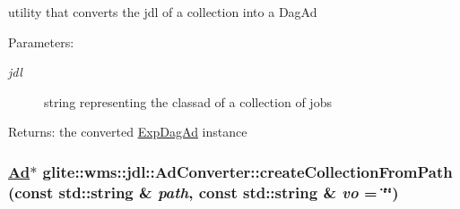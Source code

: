 utility that converts the jdl of a collection into a Dag\-Ad \begin{Desc}
\item[Parameters:]
\begin{description}
\item[{\em jdl}]string representing the classad of a collection of jobs \end{description}
\end{Desc}
\begin{Desc}
\item[Returns:]the converted \hyperlink{classglite_1_1wms_1_1jdl_1_1ExpDagAd}{Exp\-Dag\-Ad} instance\end{Desc}
\hypertarget{classglite_1_1wms_1_1jdl_1_1AdConverter_z21_7}{
\subsubsection[createCollectionFromPath]{\setlength{\rightskip}{0pt plus 5cm}\hyperlink{classglite_1_1wms_1_1jdl_1_1Ad}{Ad}$\ast$ glite::wms::jdl::Ad\-Converter::create\-Collection\-From\-Path (const std::string \& {\em path}, const std::string \& {\em vo} = \char`\"{}\char`\"{})}}
\label{classglite_1_1wms_1_1jdl_1_1AdConverter_z21_7}


